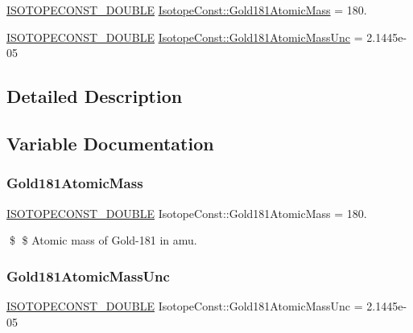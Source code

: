 \begin{DoxyCompactItemize}
\item 
\mbox{\hyperlink{group___isotope_const-_macros_ga8f45a7272ce02c0b4c65c44636ed719a}{I\+S\+O\+T\+O\+P\+E\+C\+O\+N\+S\+T\+\_\+\+D\+O\+U\+B\+LE}} \mbox{\hyperlink{group___isotope_const-_gold-_au181_gaf454daa51897feb586aea77368632d80}{Isotope\+Const\+::\+Gold181\+Atomic\+Mass}} = 180.
\item 
\mbox{\hyperlink{group___isotope_const-_macros_ga8f45a7272ce02c0b4c65c44636ed719a}{I\+S\+O\+T\+O\+P\+E\+C\+O\+N\+S\+T\+\_\+\+D\+O\+U\+B\+LE}} \mbox{\hyperlink{group___isotope_const-_gold-_au181_ga99969f55d338ff2999f7d16dc395cf39}{Isotope\+Const\+::\+Gold181\+Atomic\+Mass\+Unc}} = 2.\+1445e-\/05
\end{DoxyCompactItemize}


\subsection{Detailed Description}


\subsection{Variable Documentation}
\mbox{\label{group___isotope_const-_gold-_au181_gaf454daa51897feb586aea77368632d80}} 
\subsubsection{\texorpdfstring{Gold181\+Atomic\+Mass}{Gold181AtomicMass}}
{\footnotesize\ttfamily \mbox{\hyperlink{group___isotope_const-_macros_ga8f45a7272ce02c0b4c65c44636ed719a}{I\+S\+O\+T\+O\+P\+E\+C\+O\+N\+S\+T\+\_\+\+D\+O\+U\+B\+LE}} Isotope\+Const\+::\+Gold181\+Atomic\+Mass = 180.}

\$ \$ Atomic mass of Gold-\/181 in amu. \mbox{\label{group___isotope_const-_gold-_au181_ga99969f55d338ff2999f7d16dc395cf39}} 
\subsubsection{\texorpdfstring{Gold181\+Atomic\+Mass\+Unc}{Gold181AtomicMassUnc}}
{\footnotesize\ttfamily \mbox{\hyperlink{group___isotope_const-_macros_ga8f45a7272ce02c0b4c65c44636ed719a}{I\+S\+O\+T\+O\+P\+E\+C\+O\+N\+S\+T\+\_\+\+D\+O\+U\+B\+LE}} Isotope\+Const\+::\+Gold181\+Atomic\+Mass\+Unc = 2.\+1445e-\/05}

